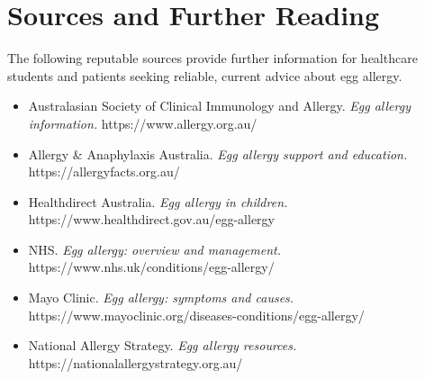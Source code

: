 \section*{Sources and Further Reading}
The following reputable sources provide further information for healthcare students and patients seeking reliable, current advice about egg allergy.
\begin{itemize}
    \item Australasian Society of Clinical Immunology and Allergy. \textit{Egg allergy information.} https://www.allergy.org.au/
    \item Allergy \& Anaphylaxis Australia. \textit{Egg allergy support and education.} https://allergyfacts.org.au/
    \item Healthdirect Australia. \textit{Egg allergy in children.} https://www.healthdirect.gov.au/egg-allergy
    \item NHS. \textit{Egg allergy: overview and management.} https://www.nhs.uk/conditions/egg-allergy/
    \item Mayo Clinic. \textit{Egg allergy: symptoms and causes.} https://www.mayoclinic.org/diseases-conditions/egg-allergy/
    \item National Allergy Strategy. \textit{Egg allergy resources.} https://nationalallergystrategy.org.au/
\end{itemize}
